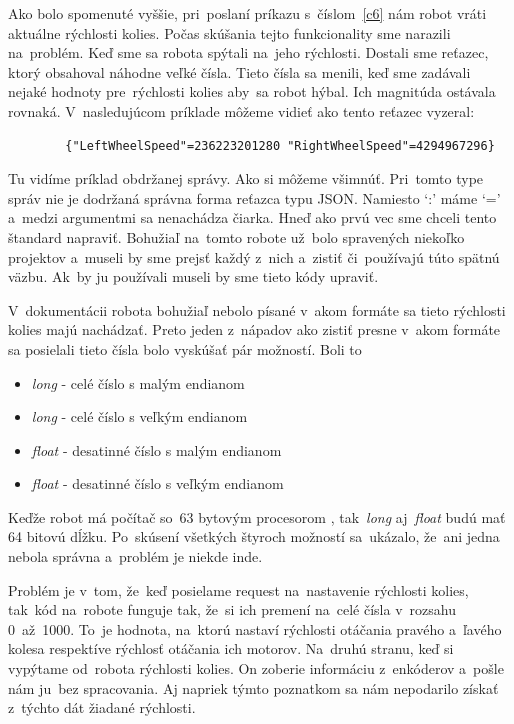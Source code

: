 Ako bolo spomenuté vyššie, pri~poslaní príkazu s~číslom~\ref{c6} nám robot vráti aktuálne rýchlosti kolies. Počas skúšania tejto funkcionality
sme narazili na~problém. Keď sme sa robota spýtali na~jeho rýchlosti. Dostali sme reťazec, ktorý obsahoval náhodne veľké čísla. Tieto čísla sa
menili, keď sme zadávali nejaké hodnoty pre~rýchlosti kolies aby~sa robot hýbal. Ich magnitúda ostávala rovnaká. V~nasledujúcom príklade môžeme
vidieť ako tento reťazec vyzeral:

\label{jsonWannabeSpeed}
\begin{lstlisting}
		{"LeftWheelSpeed"=236223201280 "RightWheelSpeed"=4294967296}
\end{lstlisting}

Tu vidíme príklad obdržanej správy. Ako si môžeme všimnúť. Pri~tomto type správ nie je dodržaná správna forma reťazca typu JSON. Namiesto `:'
máme `=' a~medzi argumentmi sa nenachádza čiarka. Hneď ako prvú vec sme chceli tento štandard napraviť. Bohužiaľ na~tomto robote už~bolo
spravených niekoľko projektov a~museli by sme prejsť každý z~nich a~zistiť či~používajú túto spätnú väzbu. Ak~by ju používali museli by sme
tieto kódy upraviť.

\newpage

V~dokumentácii robota bohužiaľ nebolo písané v~akom formáte sa tieto rýchlosti kolies majú nachádzať. Preto jeden z~nápadov ako zistiť presne
v~akom formáte sa posielali tieto čísla bolo vyskúšať pár možností. Boli to

\begin{itemize}
	\item \textit{long} - celé číslo s malým endianom
	\item \textit{long} - celé číslo s veľkým endianom
	\item \textit{float} - desatinné číslo s malým endianom
	\item \textit{float} - desatinné číslo s veľkým endianom
\end{itemize}

Keďže robot má počítač so~63 bytovým procesorom \cite{robotPc}, tak~\textit{long} aj~\textit{float} budú mať 64 bitovú dĺžku. Po~skúsení všetkých
štyroch možností sa~ukázalo, že~ani jedna nebola správna a~problém je niekde inde.

Problém je v~tom, že~keď posielame request na~nastavenie rýchlosti kolies, tak~kód na~robote funguje tak, že~si ich premení na~celé čísla v~rozsahu
0~až~1000. To~je hodnota, na~ktorú nastaví rýchlosti otáčania pravého a~ľavého kolesa respektíve rýchlosť otáčania ich motorov. Na~druhú stranu,
keď si vypýtame od~robota rýchlosti kolies. On zoberie informáciu z~enkóderov a~pošle nám ju~bez spracovania. Aj napriek týmto poznatkom sa nám
nepodarilo získať z~týchto dát žiadané rýchlosti.


